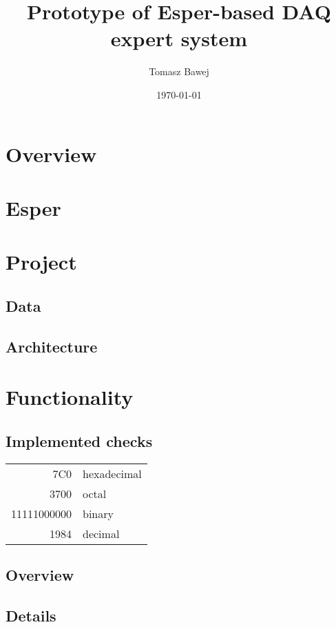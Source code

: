 \documentclass[11pt,twoside,a4paper]{report}
\title{Prototype of Esper-based DAQ expert system}
\date{\today}
\author{Tomasz Bawej}
\begin{document}
\maketitle



\section{Overview}

\section{Esper}
\section{Project}

\subsection{Data}
\subsection{Architecture}
\section{Functionality}
\subsection{Implemented checks}




\begin{tabular}{|r|l|}
  \hline
  7C0 & hexadecimal \\
  3700 & octal \\ \cline{2-2}
  11111000000 & binary \\
  \hline \hline
  1984 & decimal \\
  \hline
\end{tabular}

\subsection{Overview}
\subsection{Details}
\end{document}
